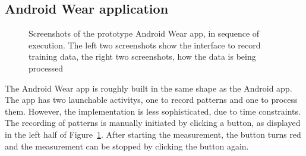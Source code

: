 \subsection{Android Wear application}
\begin{figure}
    \caption{Screenshots of the prototype Android Wear \gls{app}, in sequence of execution. The left two screenshots show the interface to record training data, the right two screenshots, how the data is being processed}
    \label{fig:wearscreenshots}
\end{figure}
The Android Wear \gls{app} is roughly built in the same shape as the Android \gls{app}. The \gls{app} has two launchable \glspl{activity}, one to record patterns and one to process them. However, the implementation is less sophisticated, due to time constraints. The recording of patterns is manually initiated by clicking a button, as displayed in the left half of Figure~\ref{fig:wearscreenshots}. After starting the measurement, the button turns red and the measurement can be stopped by clicking the button again.


